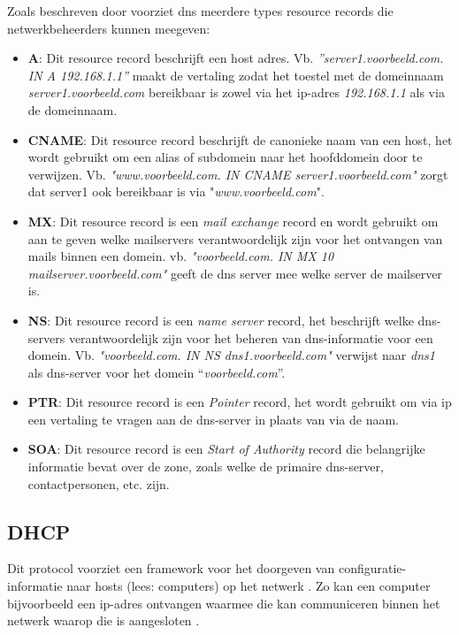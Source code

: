 Zoals beschreven door \textcite{Mockapetris1987} voorziet \acrshort{dns} meerdere types resource records die netwerkbeheerders kunnen meegeven: 
\begin{itemize}
    \item \textbf{A}: Dit resource record beschrijft een host adres. 
    Vb. \textit{”server1.voorbeeld.com. IN A 192.168.1.1”} maakt de vertaling zodat het toestel met de domeinnaam \textit{server1.voorbeeld.com} bereikbaar is zowel via het \acrshort{ip}-adres \textit{192.168.1.1} als via de domeinnaam. 
    \item \textbf{CNAME}: Dit resource record beschrijft de canonieke naam van een host, het wordt gebruikt om een alias of subdomein naar het hoofddomein door te verwijzen. Vb. \textit{"www.voorbeeld.com. IN CNAME server1.voorbeeld.com"} zorgt dat server1 ook bereikbaar is via "\textit{www.voorbeeld.com}".
    \item \textbf{MX}: Dit resource record is een \textit{mail exchange} record en wordt gebruikt om aan te geven welke mailservers verantwoordelijk zijn voor het ontvangen van mails binnen een domein. vb. \textit{"voorbeeld.com. IN MX 10 mailserver.voorbeeld.com"} geeft de \acrshort{dns} server mee welke server de mailserver is.
    \item \textbf{NS}: Dit resource record is een \textit{name server} record, het beschrijft welke \acrshort{dns}-servers verantwoordelijk zijn voor het beheren van \acrshort{dns}-informatie voor een domein. Vb. \textit{"voorbeeld.com. IN NS dns1.voorbeeld.com"} verwijst naar \textit{dns1} als \acrshort{dns}-server voor het domein “\textit{voorbeeld.com}”.
    \item \textbf{PTR}: Dit resource record is een \textit{Pointer} record, het wordt gebruikt om via \acrshort{ip} een vertaling te vragen aan de \acrshort{dns}-server in plaats van via de naam.
    \item \textbf{SOA}: Dit resource record is een \textit{Start of Authority} record die belangrijke informatie bevat over de zone, zoals welke de primaire \acrshort{dns}-server, contactpersonen, etc. zijn.
\end{itemize}

\subsection{DHCP}
Dit protocol voorziet een framework voor het doorgeven van configuratie-informatie naar hosts (lees: computers) op het netwerk . Zo kan een computer bijvoorbeeld een \acrshort{ip}-adres ontvangen waarmee die kan communiceren binnen het netwerk waarop die is aangesloten \autocite{Droms1997}.

